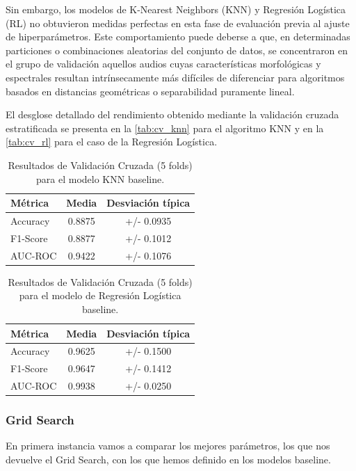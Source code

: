 Sin embargo, los modelos de K-Nearest Neighbors (KNN) y Regresión Logística (RL) no obtuvieron medidas perfectas en esta fase de evaluación previa al ajuste de hiperparámetros. Este comportamiento puede deberse a que, en determinadas particiones o combinaciones aleatorias del conjunto de datos, se concentraron en el grupo de validación aquellos audios cuyas características morfológicas y espectrales resultan intrínsecamente más difíciles de diferenciar para algoritmos basados en distancias geométricas o separabilidad puramente lineal. 

El desglose detallado del rendimiento obtenido mediante la validación cruzada estratificada se presenta en la \autoref{tab:cv_knn} para el algoritmo KNN y en la \autoref{tab:cv_rl} para el caso de la Regresión Logística.

\begin{table}[h!]
\centering
\begin{tabular}{lcc}
\toprule
\textbf{Métrica} & \textbf{Media} & \textbf{Desviación típica}\\
\midrule
Accuracy & 0.8875 & +/- 0.0935 \\
F1-Score & 0.8877 & +/- 0.1012 \\
AUC-ROC & 0.9422 & +/- 0.1076 \\ 
\bottomrule
\end{tabular}
\caption{Resultados de Validación Cruzada (5 folds) para el modelo KNN baseline.}
\label{tab:cv_knn}
\end{table}

\begin{table}[h!]
\centering
\begin{tabular}{lcc}
\toprule
\textbf{Métrica} & \textbf{Media} & \textbf{Desviación típica}\\
\midrule
Accuracy & 0.9625 & +/- 0.1500 \\
F1-Score & 0.9647 & +/- 0.1412 \\
AUC-ROC & 0.9938 & +/- 0.0250 \\ 
\bottomrule
\end{tabular}
\caption{Resultados de Validación Cruzada (5 folds) para el modelo de Regresión Logística baseline.}
\label{tab:cv_rl}
\end{table}

\subsubsection*{Grid Search}

En primera instancia vamos a comparar los mejores parámetros, los que nos devuelve el Grid Search, con los que hemos definido en los modelos baseline. 


